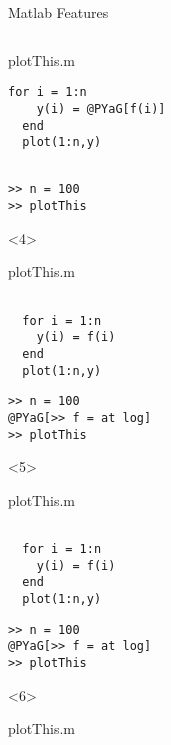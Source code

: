 \begin{frame}[fragile]{Matlab Features}
\begin{columns}
\begin{column}{5cm}
\begin{onlyenv}
\begin{block}{plotThis.m}
\begin{Verbatim}[commandchars=@\[\]]
  for i = 1:n
    y(i) = @PYaG[f(i)]
  end
  plot(1:n,y)
          \end{Verbatim}
        \end{block}
          \begin{Verbatim}[commandchars=@\[\]]

>> n = 100
>> plotThis
        \end{Verbatim}
      \end{onlyenv}
      \begin{onlyenv}<4>
        \begin{block}{plotThis.m}
          \begin{Verbatim}[commandchars=@\[\]]

  for i = 1:n
    y(i) = f(i)
  end
  plot(1:n,y)
          \end{Verbatim}
        \end{block}
          \begin{Verbatim}[commandchars=@\[\]]
>> n = 100
@PYaG[>> f = at log]
>> plotThis
        \end{Verbatim}
      \end{onlyenv}
      \begin{onlyenv}<5>
        \begin{block}{plotThis.m}
          \begin{Verbatim}[commandchars=@\[\]]

  for i = 1:n
    y(i) = f(i)
  end
  plot(1:n,y)
          \end{Verbatim}
        \end{block}
          \begin{Verbatim}[commandchars=@\[\]]
>> n = 100
@PYaG[>> f = at log]
>> plotThis
        \end{Verbatim}
      \end{onlyenv}
      \begin{onlyenv}<6>
        \begin{block}{plotThis.m}
          \begin{Verbatim}[commandchars=@\[\]]


\end{Verbatim}
\end{block}
\end{onlyenv}
\end{column}
\end{columns}
\end{frame}
